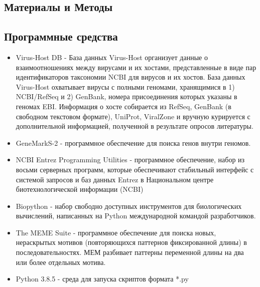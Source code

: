 \documentclass[14pt]{extarticle}
\begin{document}
    
\newpage
\begin{center}
\item \section{Материалы и Методы} \label{sec:code}
\item \subsection{Программные средства}
\end{center}
\begin{itemize}
    \item Virus-Host DB - База данных Virus-Host организует данные о взаимоотношениях между вирусами и их хостами,
    представленные в виде пар идентификаторов таксономии NCBI для вирусов и их хостов. База данных Virus-Host охватывает
    вирусы с полными геномами, хранящимися в 1) NCBI/RefSeq и 2) GenBank, номера присоединения которых указаны в геномах
    EBI. Информация о хосте собирается из RefSeq, GenBank (в свободном текстовом формате), UniProt, ViralZone и вручную
    курируется с дополнительной информацией, полученной в результате опросов литературы. \cite{virus-host}
    
    \item GeneMarkS-2 - программное обеспечение для поиска генов внутри геномов. \cite{lomsad}
    
    \item NCBI Entrez Programming Utilities - программное обеспечение, набор из восьми серверных программ, которые
    обеспечивают стабильный интерфейс с системой запросов и баз данных Entrez в Национальном центре биотехнологической
    информации (NCBI) \cite{entrez}
    
    \item Biopython - набор свободно доступных инструментов для биологических вычислений, написанных на Python
    международной командой разработчиков. \cite{biopython}
    
    \item The MEME Suite - программное обеспечение для поиска новых, нераскрытых мотивов (повторяющихся паттернов
    фиксированной длины) в последовательностях. МЕМ разбивает паттерны переменной длины на два или более отдельных
    мотива. \cite{bailey}
    
    \item Python 3.8.5 - среда для запуска скриптов формата *.py \cite{python}
    

\end{itemize}
\end{document}
